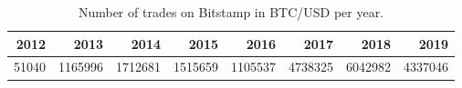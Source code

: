 \begin{table}[t]

\caption{\label{tab:}Number of trades on Bitstamp in BTC/USD per year.}
\centering
\begin{tabular}{rrrrrrrr}
\toprule
2012 & 2013 & 2014 & 2015 & 2016 & 2017 & 2018 & 2019\\
\midrule
51040 & 1165996 & 1712681 & 1515659 & 1105537 & 4738325 & 6042982 & 4337046\\
\bottomrule
\end{tabular}
\end{table}
